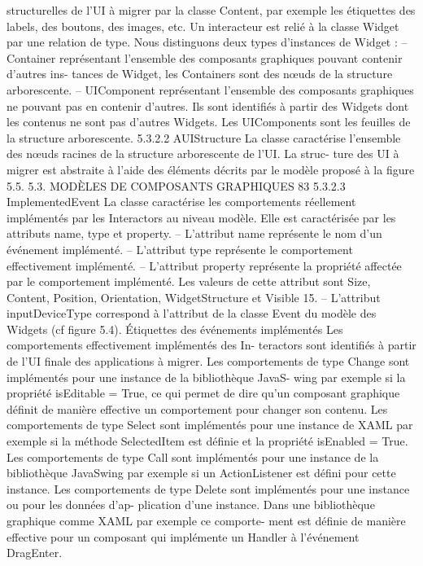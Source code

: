 \documentclass{article}
\begin{document}
structurelles de l’UI à migrer par la classe Content, par exemple les étiquettes des labels, des boutons,
des images, etc. Un interacteur est relié à la classe Widget par une relation de type. Nous distinguons
deux types d’instances de Widget :
– Container représentant l’ensemble des composants graphiques pouvant contenir d’autres ins-
tances de Widget, les Containers sont des nœuds de la structure arborescente.
– UIComponent représentant l’ensemble des composants graphiques ne pouvant pas en contenir
d’autres. Ils sont identiﬁés à partir des Widgets dont les contenus ne sont pas d’autres Widgets.
Les UIComponents sont les feuilles de la structure arborescente.
5.3.2.2
AUIStructure
La classe caractérise l’ensemble des nœuds racines de la structure arborescente de l’UI. La struc-
ture des UI à migrer est abstraite à l’aide des éléments décrits par le modèle proposé à la ﬁgure 5.5.
5.3. MODÈLES DE COMPOSANTS GRAPHIQUES
83
5.3.2.3
ImplementedEvent
La classe caractérise les comportements réellement implémentés par les Interactors au niveau
modèle. Elle est caractérisée par les attributs name, type et property.
– L’attribut name représente le nom d’un événement implémenté.
– L’attribut type représente le comportement effectivement implémenté.
– L’attribut property représente la propriété affectée par le comportement implémenté. Les valeurs
de cette attribut sont Size, Content, Position, Orientation, WidgetStructure et Visible 15.
– L’attribut inputDeviceType correspond à l’attribut de la classe Event du modèle des Widgets (cf
ﬁgure 5.4).
Étiquettes des événements implémentés
Les comportements effectivement implémentés des In-
teractors sont identiﬁés à partir de l’UI ﬁnale des applications à migrer.
Les comportements de type Change sont implémentés pour une instance de la bibliothèque JavaS-
wing par exemple si la propriété isEditable = True, ce qui permet de dire qu’un composant graphique
déﬁnit de manière effective un comportement pour changer son contenu.
Les comportements de type Select sont implémentés pour une instance de XAML par exemple si
la méthode SelectedItem est déﬁnie et la propriété isEnabled = True.
Les comportements de type Call sont implémentés pour une instance de la bibliothèque JavaSwing
par exemple si un ActionListener est déﬁni pour cette instance.
Les comportements de type Delete sont implémentés pour une instance ou pour les données d’ap-
plication d’une instance. Dans une bibliothèque graphique comme XAML par exemple ce comporte-
ment est déﬁnie de manière effective pour un composant qui implémente un Handler à l’événement
DragEnter.
\end{document}
